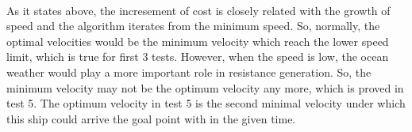\\As it states above, the incresement of cost is closely related with the growth of speed and the algorithm iterates from the minimum speed. So, normally, the optimal velocities would be the minimum velocity which reach the lower speed limit, which is true for first 3 tests. However, when the speed is low, the ocean weather would play a more important role in resistance generation. So, the minimum velocity may not be the optimum velocity any more, which is proved in test 5. The optimum velocity in test 5 is the second minimal velocity under which this ship could arrive the goal point with in the given time.